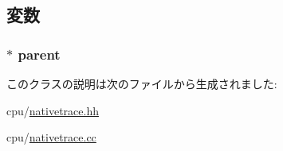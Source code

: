 \subsection{変数}
\hypertarget{classTrace_1_1NativeTraceRecord_a230d57514a137a26f65ed0c89a3cbd2f}{
\subsubsection[{parent}]{$\ast$ {\bf parent}}}
\label{classTrace_1_1NativeTraceRecord_a230d57514a137a26f65ed0c89a3cbd2f}


このクラスの説明は次のファイルから生成されました:\begin{DoxyCompactItemize}
\item 
cpu/\hyperlink{cpu_2nativetrace_8hh}{nativetrace.hh}\item 
cpu/\hyperlink{cpu_2nativetrace_8cc}{nativetrace.cc}\end{DoxyCompactItemize}
